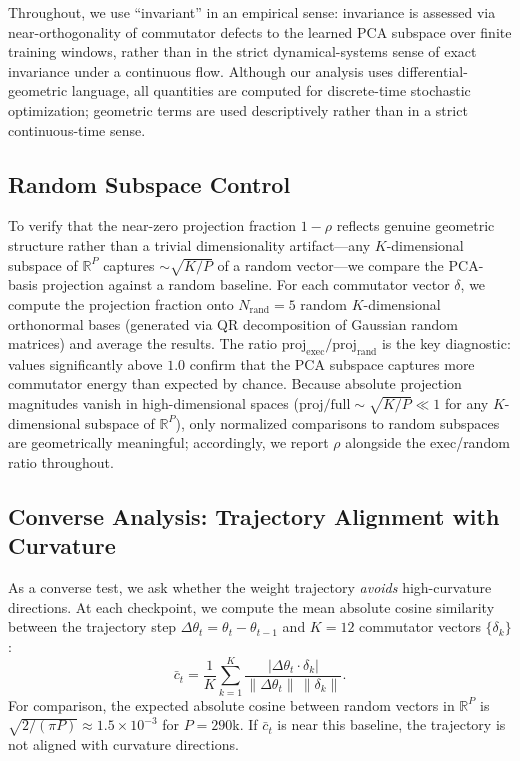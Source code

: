 \documentclass[11pt]{article}
\newcommand{\R}{\mathbb{R}}
\newcommand{\norm}[1]{\left\|#1\right\|}
\begin{document}
Throughout, we use ``invariant'' in an empirical sense: invariance is assessed via near-orthogonality of commutator defects to the learned PCA subspace over finite training windows, rather than in the strict dynamical-systems sense of exact invariance under a continuous flow.
Although our analysis uses differential-geometric language, all quantities are computed for discrete-time stochastic optimization; geometric terms are used descriptively rather than in a strict continuous-time sense.

\subsection{Random Subspace Control}
\label{sec:random_control}

To verify that the near-zero projection fraction $1 - \rho$ reflects genuine geometric structure rather than a trivial dimensionality artifact---any $K$-dimensional subspace of $\R^P$ captures $\sim\!\sqrt{K/P}$ of a random vector---we compare the PCA-basis projection against a random baseline.
For each commutator vector $\delta$, we compute the projection fraction onto $N_\text{rand} = 5$ random $K$-dimensional orthonormal bases (generated via QR decomposition of Gaussian random matrices) and average the results.
The ratio $\text{proj}_{\text{exec}} / \text{proj}_{\text{rand}}$ is the key diagnostic: values significantly above $1.0$ confirm that the PCA subspace captures more commutator energy than expected by chance.
Because absolute projection magnitudes vanish in high-dimensional spaces ($\text{proj}/\text{full} \sim \sqrt{K/P} \ll 1$ for any $K$-dimensional subspace of $\R^P$), only normalized comparisons to random subspaces are geometrically meaningful; accordingly, we report $\rho$ alongside the exec/random ratio throughout.

\subsection{Converse Analysis: Trajectory Alignment with Curvature}
\label{sec:converse}

As a converse test, we ask whether the weight trajectory \emph{avoids} high-curvature directions.
At each checkpoint, we compute the mean absolute cosine similarity between the trajectory step $\Delta\theta_t = \theta_t - \theta_{t-1}$ and $K = 12$ commutator vectors $\{\delta_k\}$:
\begin{equation}
    \bar{c}_t = \frac{1}{K} \sum_{k=1}^K \frac{|\Delta\theta_t \cdot \delta_k|}{\norm{\Delta\theta_t}\,\norm{\delta_k}}.
\end{equation}
For comparison, the expected absolute cosine between random vectors in $\R^P$ is $\sqrt{2/(\pi P)} \approx 1.5 \times 10^{-3}$ for $P = 290$k.
If $\bar{c}_t$ is near this baseline, the trajectory is not aligned with curvature directions.
\end{document}
